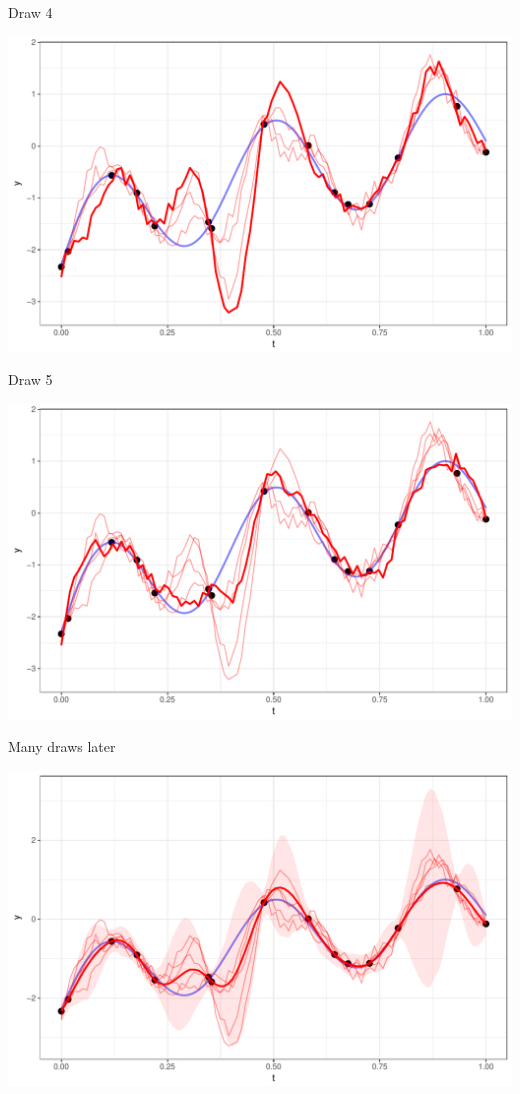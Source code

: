 \documentclass[11pt,ignorenonframetext,]{beamer}
\begin{document}
\begin{frame}{Draw 4}

\includegraphics{Lec12_files/figure-beamer/unnamed-chunk-8-1.pdf}

\end{frame}

\begin{frame}{Draw 5}

\includegraphics{Lec12_files/figure-beamer/unnamed-chunk-9-1.pdf}

\end{frame}

\begin{frame}{Many draws later}

\includegraphics{Lec12_files/figure-beamer/unnamed-chunk-10-1.pdf}

\end{frame}
\end{document}
